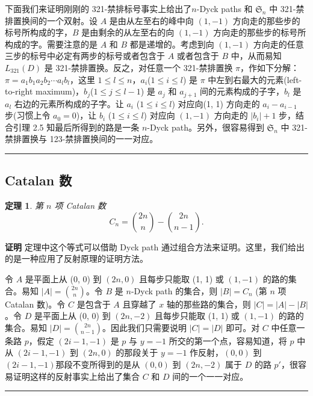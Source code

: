 \documentclass[a4paper,11pt]{article}
\newtheorem{thm}{定理}[section]
\def\qed{\nopagebreak\hfill{\rule{4pt}{7pt}}\medbreak}
\begin{document}
下面我们来证明刚刚的 321-禁排标号事实上给出了$n$-Dyck paths 和
$\mathfrak{S}_n$ 中 321-禁排置换间的一个双射。设 $A$
是由从左至右的峰中向 $(1, -1)$ 方向走的那些步的标号所构成的字，$B$
是由剩余的从左至右的向 $(1, -1)$
方向走的那些步的标号所构成的字。需要注意的是 $A$ 和 $B$
都是递增的。考虑到向 $(1, -1)$
方向走的任意三步的标号中必定有两步的标号或者包含于 $A$ 或者包含于
$B$ 中，从而易知 $L_{321}(D)$ 是 321-禁排置换。反之，对任意一个
321-禁排置换 $\pi$，作如下分解：$\pi=a_1b_1a_2b_2\cdots
a_lb_l$，这里 $1\le l\le n$，$a_i$($1\le i\le l$) 是 $\pi$
中左到右最大的元素(left-to-right maximum)，$b_j$($1\le j\le l-1$) 是
$a_j$ 和 $a_{j+1}$ 间的元素构成的子字，$b_l$ 是 $a_l$
右边的元素所构成的子字。让 $a_i$ ($1\le i\le l$) 对应向(1, 1)
方向走的 $a_i-a_{i-1}$ 步(习惯上令 $a_0=0$)，让 $b_i$ ($1\le i\le
l$) 对应向 $(1, -1)$ 方向走的 $|b_i|+1$ 步，结合引理 2.5
知最后所得到的路是一条 $n$-Dyck path。另外，很容易得到
$\mathfrak{S}_n$ 中 321-禁排置换与 123-禁排置换间的一一对应。\qed

\subsection{Catalan 数}

\begin{thm}第 $n$ 项 Catalan 数
$$C_n={2n\choose n}-{2n\choose n-1}.$$
\end{thm}
{\bf{证明}} 定理中这个等式可以借助 Dyck path
通过组合方法来证明。这里，我们给出的是一种应用了反射原理的证明方法。

令 $A$ 是平面上从 (0, 0) 到 $(2n, 0)$ 且每步只能取 (1, 1) 或 $(1,
-1)$ 的路的集合。易知 $|A|={2n\choose n}$。令 $B$ 是 $n$-Dyck path
的集合，则 $|B|=C_n$ (第 $n$ 项 Catalan 数)。令 $C$ 是包含于 $A$
且穿越了 $x$ 轴的那些路的集合，则 $|C|=|A|-|B|$。令 $D$ 是平面上从
(0, 0) 到 $(2n, -2)$ 且每步只能取 (1, 1) 或 $(1, -1)$
的路的集合。易知 $|D|={2n\choose n-1}$。因此我们只需要说明 $|C|=|D|$
即可。对 $C$ 中任意一条路 $p$，假定 $(2i-1, -1)$ 是 $p$ 与 $y=-1$
所交的第一个点，容易知道，将 $p$ 中从 $(2i-1, -1)$ 到 $(2n, 0)$
的那段关于 $y=-1$ 作反射，$(0, 0)$ 到 $(2i-1,
-1)$那段不变所得到的是从 $(0, 0)$ 到 $(2n, -2)$ 属于 $D$ 的路
$p'$，很容易证明这样的反射事实上给出了集合 $C$ 和 $D$
间的一个一一对应。\qed
\end{document}
